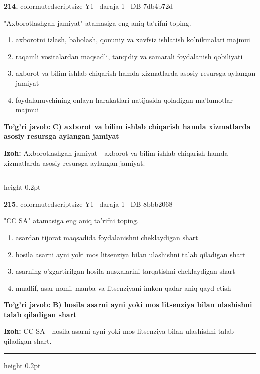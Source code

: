 \documentclass[10pt,a4paper,oneside]{article}
\begin{document}
\noindent\textbf{\color{ink}214.}  {color{muted}scriptsize Y1 \textbullet\ daraja 1 \textbullet\ DB 7db4b72d}
\par
"Axborotlashgan jamiyat" atamasiga eng aniq ta'rifni toping.
\begin{enumerate}[label=\Alph*),leftmargin=9mm]
\item axborotni izlash, baholash, qonuniy va xavfsiz ishlatish ko'nikmalari majmui
\item raqamli vositalardan maqsadli, tanqidiy va samarali foydalanish qobiliyati
\item axborot va bilim ishlab chiqarish hamda xizmatlarda asosiy resursga aylangan jamiyat
\item foydalanuvchining onlayn harakatlari natijasida qoladigan ma'lumotlar majmui
\end{enumerate}
\begin{tcolorbox}[enhanced,breakable,colback=teal!4,colframe=teal!50!black,boxrule=0.5pt,arc=1.1mm,left=3mm,right=3mm,top=1.7mm,bottom=1.7mm,before skip=2mm,after skip=2mm]
\textbf{\color{teal}To'g'ri javob:} \textbf{C) axborot va bilim ishlab chiqarish hamda xizmatlarda asosiy resursga aylangan jamiyat}
\par\smallskip
\textbf{Izoh:} Axborotlashgan jamiyat - axborot va bilim ishlab chiqarish hamda xizmatlarda asosiy resursga aylangan jamiyat.
\end{tcolorbox}
\vspace{2mm}\hrule height 0.2pt \vspace{3mm}

\noindent\textbf{\color{ink}215.}  {color{muted}scriptsize Y1 \textbullet\ daraja 1 \textbullet\ DB 8bbb2068}
\par
"CC SA" atamasiga eng aniq ta'rifni toping.
\begin{enumerate}[label=\Alph*),leftmargin=9mm]
\item asardan tijorat maqsadida foydalanishni cheklaydigan shart
\item hosila asarni ayni yoki mos litsenziya bilan ulashishni talab qiladigan shart
\item asarning o'zgartirilgan hosila nusxalarini tarqatishni cheklaydigan shart
\item muallif, asar nomi, manba va litsenziyani imkon qadar aniq qayd etish
\end{enumerate}
\begin{tcolorbox}[enhanced,breakable,colback=teal!4,colframe=teal!50!black,boxrule=0.5pt,arc=1.1mm,left=3mm,right=3mm,top=1.7mm,bottom=1.7mm,before skip=2mm,after skip=2mm]
\textbf{\color{teal}To'g'ri javob:} \textbf{B) hosila asarni ayni yoki mos litsenziya bilan ulashishni talab qiladigan shart}
\par\smallskip
\textbf{Izoh:} CC SA - hosila asarni ayni yoki mos litsenziya bilan ulashishni talab qiladigan shart.
\end{tcolorbox}
\vspace{2mm}\hrule height 0.2pt \vspace{3mm}
\end{document}

